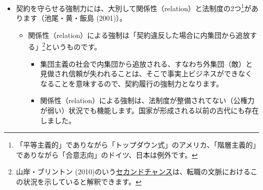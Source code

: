 \documentclass[
]{book}
\begin{document}
\begin{itemize}
\item
  契約を守らせる強制力には、大別して関係性（relation）と法制度の2つ\footnote{「平等主義的」でありながら「トップダウン式」のアメリカ、「階層主義的」でありながら「合意志向」のドイツ、日本は例外です。}があります（池尾・黄・飯島 (2001)）。

  \begin{itemize}
  \item
    関係性（relation）による強制は「契約違反した場合に内集団から追放する」\footnote{山岸・ブリントン (2010)のいう\protect\hyperlink{labor}{セカンドチャンス}は、転職の文脈におけるこの状況を示していると解釈できます。}というものです。

    \begin{itemize}
    \item
      集団主義の社会で内集団から追放される、すなわち外集団（敵）と見做され信頼が失われることは、そこで事実上ビジネスができなくなることを意味するので、契約履行の強制力となります。
    \item
      関係性（relation）による強制は、法制度が整備されてない（公権力が弱い）状況でも機能します。国家が形成される以前の古代にも存在しました。
    \end{itemize}
  \end{itemize}
\end{itemize}
\end{document}
